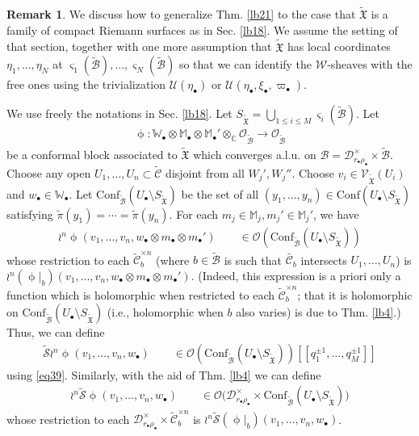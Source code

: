 \documentclass[12pt,a4paper,notitlepage]{article}
\theoremstyle{definition}
\newtheorem{rem}[df]{Remark}
\theoremstyle{plain}
\newcommand{\fk}{\mathfrak}
\newcommand{\mc}{\mathcal}
\newcommand{\wtd}{\widetilde}
\newcommand{\Conf}{\mathrm{Conf}}
\newcommand{\scr}{\mathscr}
\newcommand{\sgm}{\varsigma}
\newcommand{\blt}{\bullet}
\newcommand{\Wbb}{\mathbb W}
\newcommand{\Mbb}{\mathbb M}
\newcommand{\Cbb}{\mathbb C}
\newcommand{\SXtd}{S_{\wtd{\fk X}}}
\numberwithin{equation}{section}
\begin{document}
\begin{rem}
We discuss how to generalize Thm. \ref{lb21} to the case that $\wtd{\fk X}$ is a family of compact Riemann surfaces as in Sec. \ref{lb18}. We assume the setting of that section, together with one more assumption that $\wtd{\fk X}$ has local coordinates $\eta_1,\dots,\eta_N$ at $\sgm_1(\wtd{\mc B}),\dots,\sgm_N(\wtd{\mc B})$ so that we can identify the $\scr W$-sheaves with the free ones using the trivialization $\mc U(\eta_\blt)$ or $\mc U(\eta_\blt,\xi_\blt,\varpi_\blt)$.

We use freely the notations in Sec. \ref{lb18}. Let $\SXtd=\bigcup_{1\leq i\leq M}\sgm_i(\wtd{\mc B})$. Let
\begin{align*}
\upphi:\Wbb_\blt\otimes\Mbb_\blt\otimes\Mbb_\blt'\otimes_\Cbb\scr O_{\wtd{\mc B}}\rightarrow \scr O_{\wtd{\mc B}}	
\end{align*}
be a conformal block associated to $\wtd{\fk X}$ which converges a.l.u. on $\mc B=\mc D_{r_\blt\rho_\blt}^\times\times\wtd{\mc B}$. Choose any open $U_1,\dots,U_n\subset\wtd{\mc C}$ disjoint from all $W_j',W_j''$. Choose $v_i\in\scr V_{\wtd{\fk X}}(U_i)$ and $w_\blt\in\Wbb_\blt$. Let $\Conf_{\wtd{\mc B}}(U_\blt\setminus\SXtd)$ be the set of all $(y_1,\dots,y_n)\in\Conf(U_\blt\setminus\SXtd)$ satisfying $\wtd\pi(y_1)=\cdots=\wtd\pi(y_n)$.  For each $m_j\in\Mbb_j,m_j'\in\Mbb_j'$, we have
\begin{align*}
	\wr^n\upphi(v_1,\dots,v_n,w_\blt\otimes m_\blt\otimes m_\blt')\qquad \in\scr O(\Conf_{\wtd{\mc B}}(U_\blt\setminus\SXtd))	
\end{align*}
whose restriction to each $\wtd{\mc C}_b^{\times n}$ (where $b\in\wtd{\mc B}$ is such that $\wtd{\mc C_b}$ intersects $U_1,\dots,U_n$) is $\wr^n(\upphi|_b)(v_1,\dots,v_n,w_\blt\otimes m_\blt\otimes m_\blt')$. (Indeed, this expression is a priori only a function which is holomorphic when restricted to each $\wtd{\mc C}_b^{\times n}$; that it is holomorphic on $\Conf_{\wtd{\mc B}}(U_\blt\setminus\SXtd)$ (i.e., holomorphic when $b$ also varies) is due to Thm. \ref{lb4}.) Thus, we can define
\begin{align}
\wtd{\mc S}\wr^n\upphi(v_1,\dots,v_n,w_\blt)\qquad\in\scr O(\Conf_{\wtd{\mc B}}(U_\blt\setminus\SXtd))[[q_1^{\pm 1},\dots,q_M^{\pm 1}]] \label{eq40}
\end{align}
using \eqref{eq39}. Similarly, with the aid of Thm. \ref{lb4} we can define
\begin{align}
\wr^n\wtd{\mc S}\upphi(v_1,\dots,v_n,w_\blt)	\qquad\in\scr O\big(\mc D_{r_\blt\rho_\blt}^\times\times\Conf_{\wtd{\mc B}}(U_\blt\setminus\SXtd)\big)	\label{eq41}
\end{align}
whose restriction to each $\mc D_{r_\blt\rho_\blt}^\times\times\wtd{\mc C}_b^{\times n}$ is $\wr^n\wtd{\mc S}(\upphi|_b)(v_1,\dots,v_n,w_\blt)$.




\end{rem}
\end{document}
